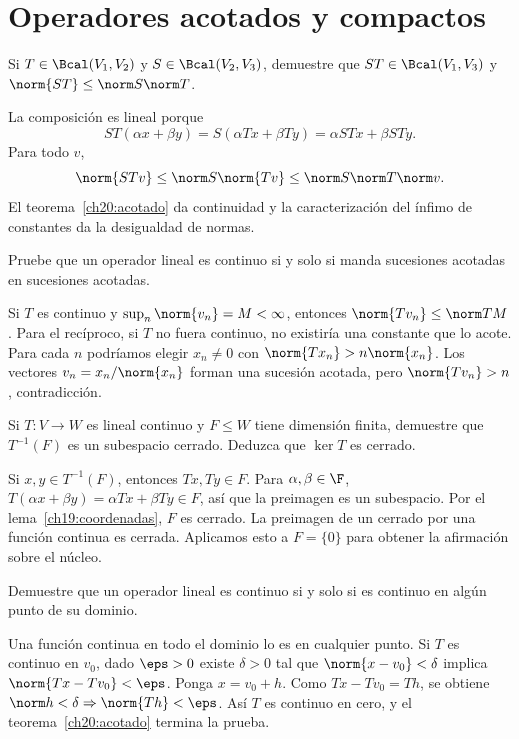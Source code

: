 \chapter{Operadores acotados y compactos}

\begin{ejercicio}\label{ej:lectura-20-1}
Si $T\in\Bcal(V_1,V_2)$ y $S\in\Bcal(V_2,V_3)$, demuestre que $ST\in\Bcal(V_1,V_3)$ y $\norm{ST}\leq\norm S\norm T$.
\end{ejercicio}
\begin{solucion}
La composición es lineal porque
\[
 ST(\alpha x+\beta y)=S(\alpha Tx+\beta Ty)=\alpha STx+\beta STy.
\]
Para todo $v$,
\[
 \norm{STv}\leq\norm S\norm{Tv}\leq\norm S\norm T\norm v.
\]
El teorema~\ref{ch20:acotado} da continuidad y la caracterización del ínfimo de constantes da la desigualdad de normas.
\end{solucion}

\begin{ejercicio}\label{ej:lectura-20-2}
Pruebe que un operador lineal es continuo si y solo si manda sucesiones acotadas en sucesiones acotadas.
\end{ejercicio}
\begin{solucion}
Si $T$ es continuo y $\sup_n\norm{v_n}=M<\infty$, entonces $\norm{Tv_n}\leq\norm T M$. Para el recíproco, si $T$ no fuera continuo, no existiría una constante que lo acote. Para cada $n$ podríamos elegir $x_n\ne0$ con $\norm{Tx_n}>n\norm{x_n}$. Los vectores $v_n=x_n/\norm{x_n}$ forman una sucesión acotada, pero $\norm{Tv_n}>n$, contradicción.
\end{solucion}

\begin{ejercicio}\label{ej:lectura-20-3}
Si $T:V\to W$ es lineal continuo y $F\leq W$ tiene dimensión finita, demuestre que $T^{-1}(F)$ es un subespacio cerrado. Deduzca que $\ker T$ es cerrado.
\end{ejercicio}
\begin{solucion}
Si $x,y\in T^{-1}(F)$, entonces $Tx,Ty\in F$. Para $\alpha,\beta\in\F$, $T(\alpha x+\beta y)=\alpha Tx+\beta Ty\in F$, así que la preimagen es un subespacio. Por el lema~\ref{ch19:coordenadas}, $F$ es cerrado. La preimagen de un cerrado por una función continua es cerrada. Aplicamos esto a $F=\{0\}$ para obtener la afirmación sobre el núcleo.
\end{solucion}

\begin{ejercicio}\label{ej:lectura-20-4}
Demuestre que un operador lineal es continuo si y solo si es continuo en algún punto de su dominio.
\end{ejercicio}
\begin{solucion}
Una función continua en todo el dominio lo es en cualquier punto. Si $T$ es continuo en $v_0$, dado $\eps>0$ existe $\delta>0$ tal que $\norm{x-v_0}<\delta$ implica $\norm{Tx-Tv_0}<\eps$. Ponga $x=v_0+h$. Como $Tx-Tv_0=Th$, se obtiene $\norm h<\delta\Rightarrow\norm{Th}<\eps$. Así $T$ es continuo en cero, y el teorema~\ref{ch20:acotado} termina la prueba.
\end{solucion}

